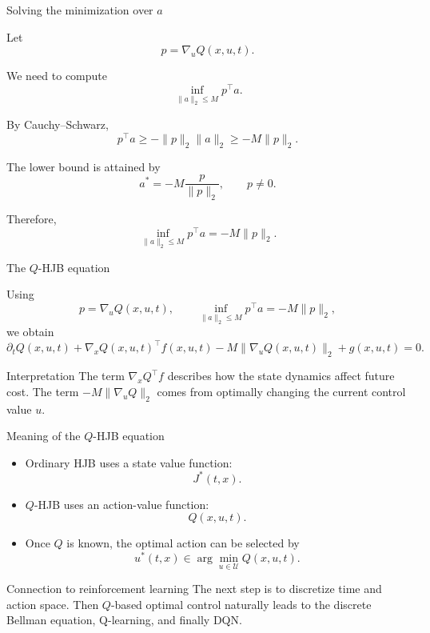 \documentclass[aspectratio=169]{beamer}
\begin{document}
\begin{frame}{Solving the minimization over \(a\)}

Let
\[
p=\nabla_u Q(x,u,t).
\]

We need to compute
\[
\inf_{\|a\|_2\le M}p^\top a.
\]

By Cauchy--Schwarz,
\[
p^\top a\ge -\|p\|_2\|a\|_2\ge -M\|p\|_2.
\]

The lower bound is attained by
\[
a^*=-M\frac{p}{\|p\|_2},
\qquad p\neq0.
\]

Therefore,
\[
\inf_{\|a\|_2\le M}p^\top a
=
-M\|p\|_2.
\]

\end{frame}


\begin{frame}{The \(Q\)-HJB equation}

Using
\[
p=\nabla_u Q(x,u,t),
\qquad
\inf_{\|a\|_2\le M}p^\top a
=
-M\|p\|_2,
\]
we obtain
\[
\boxed{
\partial_t Q(x,u,t)
+
\nabla_x Q(x,u,t)^\top f(x,u,t)
-
M\|\nabla_u Q(x,u,t)\|_2
+
g(x,u,t)
=
0.
}
\]

\vspace{0.2cm}

\begin{block}{Interpretation}
\small
The term \(\nabla_xQ^\top f\) describes how the state dynamics affect future cost.
The term \(-M\|\nabla_uQ\|_2\) comes from optimally changing the current control value \(u\).
\end{block}

\end{frame}


\begin{frame}{Meaning of the \(Q\)-HJB equation}

\begin{itemize}
    \item Ordinary HJB uses a state value function:
    \[
    J^*(t,x).
    \]


    \item \(Q\)-HJB uses an action-value function:
    \[
    Q(x,u,t).
    \]


    \item Once \(Q\) is known, the optimal action can be selected by
    \[
    u^*(t,x)\in\arg\min_{u\in\mathcal U}Q(x,u,t).
    \]
\end{itemize}

\begin{alertblock}{Connection to reinforcement learning}
\small
The next step is to discretize time and action space.
Then \(Q\)-based optimal control naturally leads to the discrete Bellman equation,
Q-learning, and finally DQN.
\end{alertblock}

\end{frame}
\end{document}
